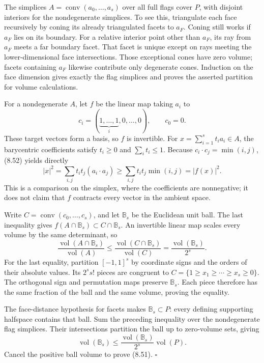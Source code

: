 \documentclass[
  11pt,
  a4paper,
]{article}
\begin{document}
The simplices \(A=\operatorname{conv}(a_0,\ldots,a_s)\) over all full
flags cover \(P\), with disjoint interiors for the nondegenerate
simplices. To see this, triangulate each face recursively by coning its
already triangulated facets to \(a_F\). Coning still works if \(a_F\)
lies on its boundary. For a relative interior point other than \(a_F\),
its ray from \(a_F\) meets a far boundary facet. That facet is unique
except on rays meeting the lower-dimensional face intersections. Those
exceptional cones have zero volume; facets containing \(a_F\) likewise
contribute only degenerate cones. Induction on the face dimension gives
exactly the flag simplices and proves the asserted partition for volume
calculations.

For a nondegenerate \(A\), let \(f\) be the linear map taking \(a_i\) to
\[
c_i=(\underbrace{1,\ldots,1}_{i},0,\ldots,0),\qquad c_0=0.
\] These target vectors form a basis, so \(f\) is invertible. For
\(x=\sum_{i=1}^s t_i a_i\in A\), the barycentric coefficients satisfy
\(t_i\ge0\) and \(\sum_i t_i\le1\). Because \(c_i\cdot c_j=\min(i,j)\),
(8.52) yields directly \[
|x|^2
=\sum_{i,j}t_it_j(a_i\cdot a_j)
\ge\sum_{i,j}t_it_j\min(i,j)
=|f(x)|^2.
\] This is a comparison on the simplex, where the coefficients are
nonnegative; it does not claim that \(f\) contracts every vector in the
ambient space.

Write \(C=\operatorname{conv}(c_0,\ldots,c_s)\), and let \(\mathbb B_s\)
be the Euclidean unit ball. The last inequality gives
\(f(A\cap\mathbb B_s)\subset C\cap\mathbb B_s\). An invertible linear
map scales every volume by the same determinant, so \[
\frac{\operatorname{vol}(A\cap\mathbb B_s)}{\operatorname{vol}(A)}
\le
\frac{\operatorname{vol}(C\cap\mathbb B_s)}{\operatorname{vol}(C)}
=\frac{\operatorname{vol}(\mathbb B_s)}{2^s}.
\] For the last equality, partition \([-1,1]^s\) by coordinate signs and
the orders of their absolute values. Its \(2^ss!\) pieces are congruent
to \(C=\{1\ge x_1\ge\cdots\ge x_s\ge0\}\). The orthogonal sign and
permutation maps preserve \(\mathbb B_s\). Each piece therefore has the
same fraction of the ball and the same volume, proving the equality.

The face-distance hypothesis for facets makes \(\mathbb B_s\subset P\):
every defining supporting halfspace contains that ball. Sum the
preceding inequality over the nondegenerate flag simplices. Their
intersections partition the ball up to zero-volume sets, giving \[
\operatorname{vol}(\mathbb B_s)
\le\frac{\operatorname{vol}(\mathbb B_s)}{2^s}
\operatorname{vol}(P).
\] Cancel the positive ball volume to prove (8.51). \(\square\)
\end{document}
